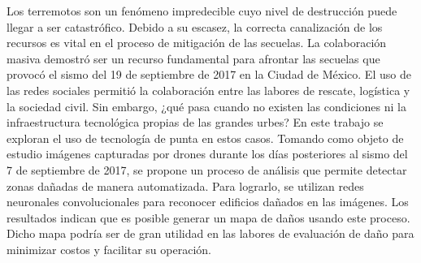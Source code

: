 Los terremotos son un fenómeno impredecible cuyo nivel de destrucción puede llegar a ser catastrófico. Debido a su escasez, la correcta canalización de los recursos es vital en el proceso de mitigación de las secuelas. La colaboración masiva demostró ser un recurso fundamental para afrontar las secuelas que provocó el sismo del 19 de septiembre de 2017 en la Ciudad de México. El uso de las redes sociales permitió la colaboración entre las labores de rescate, logística y la sociedad civil. Sin embargo, ¿qué pasa cuando no existen las condiciones ni la infraestructura tecnológica propias de las grandes urbes? En este trabajo se exploran el uso de tecnología de punta en estos casos. Tomando como objeto de estudio imágenes capturadas por drones durante los días posteriores al sismo del 7 de septiembre de 2017, se propone un proceso de análisis que permite detectar zonas dañadas de manera automatizada. Para lograrlo, se utilizan redes neuronales convolucionales para reconocer edificios dañados en las imágenes. Los resultados indican que es posible generar un mapa de daños usando este proceso. Dicho mapa podría ser de gran utilidad en las labores de evaluación de daño para minimizar costos y facilitar su operación.